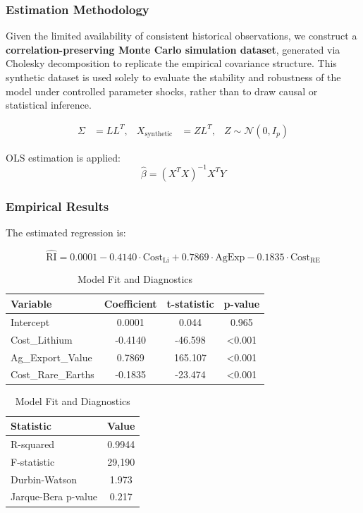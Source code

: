 \documentclass{apmcmthesis}
\begin{document}
\subsubsection{Estimation Methodology}
Given the limited availability of consistent historical observations, we construct a 
\textbf{correlation-preserving Monte Carlo simulation dataset}, generated via Cholesky 
decomposition to replicate the empirical covariance structure. This synthetic dataset is used 
solely to evaluate the stability and robustness of the model under controlled parameter shocks, 
rather than to draw causal or statistical inference.

\begin{align}
\Sigma &= LL^T, & X_{\text{synthetic}} &= ZL^T, & Z \sim \mathcal{N}(0, I_p)
\end{align}

OLS estimation is applied:
\[
\hat{\beta} = (X^TX)^{-1}X^TY
\]

\subsubsection{Empirical Results}
The estimated regression is:

\begin{equation}
\widehat{\mathrm{RI}} = 0.0001 - 0.4140 \cdot \mathrm{Cost}_{\mathrm{Li}} + 0.7869 \cdot \mathrm{AgExp} - 0.1835 \cdot \mathrm{Cost}_{\mathrm{RE}}
\end{equation}

\begin{table}[H]
\centering
\begin{minipage}{0.48\linewidth}
\centering
\caption{Regression Results}
\begin{tabular}{lccc}
\toprule
Variable & Coefficient & t-statistic & p-value \\
\midrule
Intercept & 0.0001 & 0.044 & 0.965 \\
Cost\_Lithium & -0.4140 & -46.598 & <0.001 \\
Ag\_Export\_Value & 0.7869 & 165.107 & <0.001 \\
Cost\_Rare\_Earths & -0.1835 & -23.474 & <0.001 \\
\bottomrule
\end{tabular}
\end{minipage}
\hfill
\begin{minipage}{0.48\linewidth}
\centering
\caption{Model Fit and Diagnostics}
\begin{tabular}{lc}
\toprule
Statistic & Value \\
\midrule
R-squared & 0.9944 \\
F-statistic & 29,190 \\
Durbin-Watson & 1.973 \\
Jarque-Bera p-value & 0.217 \\
\bottomrule
\end{tabular}
\end{minipage}
\end{table}
\end{document}

